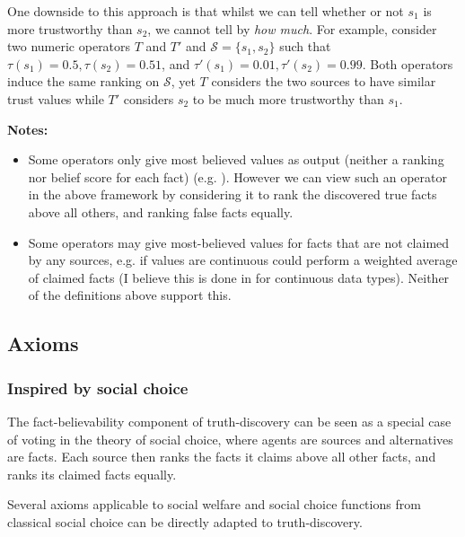 \documentclass{article}
\theoremstyle{definition} \newtheorem{definition}{Definition}
\theoremstyle{definition} \newtheorem{example}{Example}
\theoremstyle{plain} \newtheorem{axiom}{Axiom}
\theoremstyle{plain} \newtheorem*{remark}{Remark}
\theoremstyle{remark} \newtheorem*{notation}{Notation}
\theoremstyle{plain} \newtheorem{lemma}{Lemma}
\theoremstyle{plain} \newtheorem{proposition}{Proposition}
\renewcommand{\S}{\mathcal{S}}  %
\begin{document}
One downside to this approach is that whilst we can tell whether or not $s_1$
is more trustworthy than $s_2$, we cannot tell by \emph{how much}.  For
example, consider two numeric operators $T$ and $T'$ and $\S=\{s_1, s_2\}$
such that $\tau(s_1)=0.5, \tau(s_2)=0.51$, and $\tau'(s_1)=0.01,
\tau'(s_2)=0.99$. Both operators induce the same ranking on $\S$, yet $T$
considers the two sources to have similar trust values while $T'$ considers
$s_2$ to be much more trustworthy than $s_1$.

\textbf{Notes:}
\begin{itemize}

\item Some operators only give most believed values as output (neither a
ranking nor belief score for each fact) (e.g. \cite{li_conflicts}). However we
can view such an operator in the above framework by considering it to rank the
discovered true facts above all others, and ranking false facts equally.

\item Some operators may give most-believed values for facts that are not
claimed by any sources, e.g. if values are continuous could perform a weighted
average of claimed facts (I believe this is done in \cite{li_conflicts} for
continuous data types). Neither of the definitions above support this.

\end{itemize}

\subsection{Axioms}

\subsubsection{Inspired by social choice}

The fact-believability component of truth-discovery can be seen as a special
case of voting in the theory of social choice, where agents are sources and
alternatives are facts. Each source then ranks the facts it claims above all
other facts, and ranks its claimed facts equally.\footnotemark


Several axioms applicable to social welfare and social choice functions from
classical social choice can be directly adapted to truth-discovery.
\end{document}

